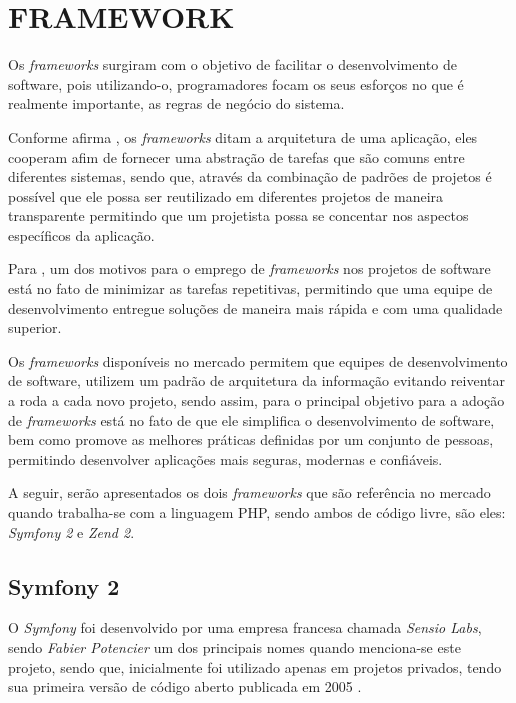 \section{FRAMEWORK}

Os \textit{frameworks} surgiram com o objetivo de facilitar o desenvolvimento de
software, pois utilizando-o, programadores focam os seus esforços no que é
realmente importante, as regras de negócio do sistema.

Conforme afirma , os
\textit{frameworks} ditam a arquitetura de uma aplicação, eles cooperam afim de fornecer
uma abstração de tarefas que são comuns entre diferentes sistemas, sendo que,
através da combinação de padrões de projetos é possível que ele possa ser
reutilizado em diferentes projetos de maneira transparente permitindo que um
projetista possa se concentar nos aspectos específicos da aplicação.

Para , um dos motivos para o
emprego de \textit{frameworks} nos projetos de software está no fato de minimizar as
tarefas repetitivas, permitindo que uma equipe de desenvolvimento entregue
soluções de maneira mais rápida e com uma qualidade superior.

Os \textit{frameworks} disponíveis no mercado permitem que equipes de
desenvolvimento de software, utilizem um padrão de arquitetura da informação
evitando reiventar a roda a cada novo projeto, sendo assim, para
 o principal objetivo para
a adoção de \textit{frameworks} está no fato de que ele simplifica o
desenvolvimento de software, bem como promove as melhores práticas definidas por
um conjunto de pessoas, permitindo desenvolver aplicações mais seguras, modernas e
confiáveis.

A seguir, serão apresentados os dois \textit{frameworks} que são referência no
mercado quando trabalha-se com a linguagem \acs{PHP}, sendo ambos de código
livre, são eles: \textit{Symfony 2} e \textit{Zend 2}.

\subsection{Symfony 2}

O \textit{Symfony} foi desenvolvido por uma empresa francesa chamada
\textit{Sensio Labs}, sendo \textit{Fabier Potencier} um dos principais nomes
quando menciona-se este projeto, sendo que, inicialmente foi utilizado apenas em
projetos privados, tendo sua primeira versão de código aberto publicada em 2005 \cite{buildingPHPApplicationsWithSymfonyCakePHPAndZendFramework}.

